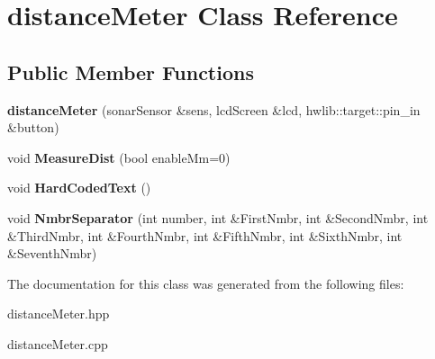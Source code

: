 \hypertarget{classdistance_meter}{}\section{distance\+Meter Class Reference}
\label{classdistance_meter}
\subsection*{Public Member Functions}
\begin{DoxyCompactItemize}
\item 
{\bfseries distance\+Meter} (sonar\+Sensor \&sens, lcd\+Screen \&lcd, hwlib\+::target\+::pin\+\_\+in \&button)\hypertarget{classdistance_meter_a34171a382d475eee81d2ee3e69d7c68b}{}\label{classdistance_meter_a34171a382d475eee81d2ee3e69d7c68b}

\item 
void {\bfseries Measure\+Dist} (bool enable\+Mm=0)\hypertarget{classdistance_meter_a2908eca77f6545f4af2926bf2aeebfbe}{}\label{classdistance_meter_a2908eca77f6545f4af2926bf2aeebfbe}

\item 
void {\bfseries Hard\+Coded\+Text} ()\hypertarget{classdistance_meter_a6c86eb72e4ed2eec069c5218907df2e1}{}\label{classdistance_meter_a6c86eb72e4ed2eec069c5218907df2e1}

\item 
void {\bfseries Nmbr\+Separator} (int number, int \&First\+Nmbr, int \&Second\+Nmbr, int \&Third\+Nmbr, int \&Fourth\+Nmbr, int \&Fifth\+Nmbr, int \&Sixth\+Nmbr, int \&Seventh\+Nmbr)\hypertarget{classdistance_meter_a4d3c885e40cdd24dc713fa8f72600e87}{}\label{classdistance_meter_a4d3c885e40cdd24dc713fa8f72600e87}

\end{DoxyCompactItemize}


The documentation for this class was generated from the following files\+:\begin{DoxyCompactItemize}
\item 
distance\+Meter.\+hpp\item 
distance\+Meter.\+cpp\end{DoxyCompactItemize}
